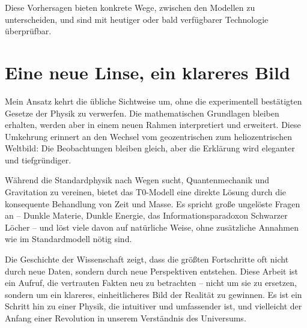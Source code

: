 \documentclass[a4paper,12pt]{article}
\begin{document}
	Diese Vorhersagen bieten konkrete Wege, zwischen den Modellen zu unterscheiden, und sind mit heutiger oder bald verfügbarer Technologie überprüfbar.
	
	\section{Eine neue Linse, ein klareres Bild}
	
	Mein Ansatz kehrt die übliche Sichtweise um, ohne die experimentell bestätigten Gesetze der Physik zu verwerfen. Die mathematischen Grundlagen bleiben erhalten, werden aber in einem neuen Rahmen interpretiert und erweitert. Diese Umkehrung erinnert an den Wechsel vom geozentrischen zum heliozentrischen Weltbild: Die Beobachtungen bleiben gleich, aber die Erklärung wird eleganter und tiefgründiger.
	
	Während die Standardphysik nach Wegen sucht, Quantenmechanik und Gravitation zu vereinen, bietet das T0-Modell eine direkte Lösung durch die konsequente Behandlung von Zeit und Masse. Es spricht große ungelöste Fragen an – Dunkle Materie, Dunkle Energie, das Informationsparadoxon Schwarzer Löcher – und löst viele davon auf natürliche Weise, ohne zusätzliche Annahmen wie im Standardmodell nötig sind.
	
	Die Geschichte der Wissenschaft zeigt, dass die größten Fortschritte oft nicht durch neue Daten, sondern durch neue Perspektiven entstehen. Diese Arbeit ist ein Aufruf, die vertrauten Fakten neu zu betrachten – nicht um sie zu ersetzen, sondern um ein klareres, einheitlicheres Bild der Realität zu gewinnen. Es ist ein Schritt hin zu einer Physik, die intuitiver und umfassender ist, und vielleicht der Anfang einer Revolution in unserem Verständnis des Universums.
	
\end{document}
